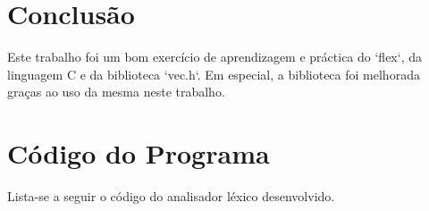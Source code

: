 \documentclass{report}
\begin{document}
\chapter{Conclusão} \label{concl}

Este trabalho foi um bom exercício de aprendizagem e práctica do `flex`, da linguagem C e da biblioteca `vec.h`. Em especial, a biblioteca foi melhorada graças ao uso da mesma neste trabalho.\\

\appendix
\chapter{Código do Programa}

Lista-se a seguir o código do analisador léxico desenvolvido.





\end{document}

